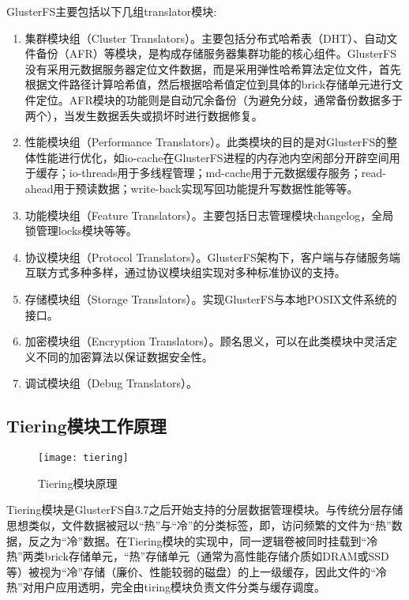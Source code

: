 GlusterFS主要包括以下几组translator模块:
\begin{enumerate}
    \item 集群模块组（Cluster Translators）。主要包括分布式哈希表（DHT）、自动文件备份（AFR）等模块，是构成存储服务器集群功能的核心组件。GlusterFS没有采用元数据服务器定位文件数据，而是采用弹性哈希算法定位文件，首先根据文件路径计算哈希值，然后根据哈希值定位到具体的brick存储单元进行文件定位。AFR模块的功能则是自动冗余备份（为避免分歧，通常备份数据多于两个），当发生数据丢失或损坏时进行数据修复。
    \item 性能模块组（Performance Translators）。此类模块的目的是对GlusterFS的整体性能进行优化，如io-cache在GlusterFS进程的内存池内空闲部分开辟空间用于缓存；io-threads用于多线程管理；md-cache用于元数据缓存服务；read-ahead用于预读数据；write-back实现写回功能提升写数据性能等等。
    \item 功能模块组（Feature Translators）。主要包括日志管理模块changelog，全局锁管理locks模块等等。
    \item 协议模块组（Protocol Translators）。GlusterFS架构下，客户端与存储服务端互联方式多种多样，通过协议模块组实现对多种标准协议的支持。
    \item 存储模块组（Storage Translators）。实现GlusterFS与本地POSIX文件系统的接口。
    \item 加密模块组（Encryption Translators）。顾名思义，可以在此类模块中灵活定义不同的加密算法以保证数据安全性。
    \item 调试模块组（Debug Translators）。
\end{enumerate}

\subsection{Tiering模块工作原理}
\begin{figure}[htp]
\centering
\texttt{[image: tiering]}
\caption{Tiering模块原理}
\label{fig:tiering}
\end{figure}
Tiering模块是GlusterFS自3.7之后开始支持的分层数据管理模块\cite{Tiering}。与传统分层存储思想类似，文件数据被冠以“热”与“冷”的分类标签，即，访问频繁的文件为“热”数据，反之为“冷”数据。在Tiering模块的实现中，同一逻辑卷被同时挂载到“冷热”两类brick存储单元，“热”存储单元（通常为高性能存储介质如DRAM或SSD等）被视为“冷”存储（廉价、性能较弱的磁盘）的上一级缓存，因此文件的“冷热”对用户应用透明，完全由tiring模块负责文件分类与缓存调度。

